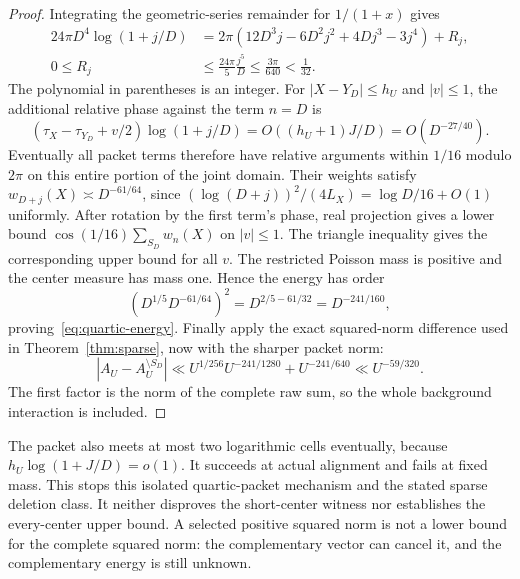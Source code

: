 \begin{proof}
Integrating the geometric-series remainder for $1/(1+x)$ gives
\begin{equation}\label{eq:quartic-taylor}
 \begin{split}
 24\pi D^4\log(1+j/D)
 &=2\pi(12D^3j-6D^2j^2+4Dj^3-3j^4)+R_j,\\
 0\le R_j&\le\frac{24\pi}{5}\frac{j^5}{D}
                  \le\frac{3\pi}{640}<\frac1{32}.
 \end{split}
\end{equation}
The polynomial in parentheses is an integer.
For $|X-Y_D|\le h_U$ and $|v|\le1$, the additional relative phase
against the term $n=D$ is
\[
 (\tau_X-\tau_{Y_D}+v/2)\log(1+j/D)
 =O((h_U+1)J/D)=O(D^{-27/40}).
\]
Eventually all packet terms therefore have relative arguments within
$1/16$ modulo $2\pi$ on this entire portion of the joint domain.
Their weights satisfy $w_{D+j}(X)\asymp D^{-61/64}$, since
$(\log(D+j))^2/(4L_X)=\log D/16+O(1)$ uniformly.
After rotation by the first term's phase, real projection gives a
lower bound $\cos(1/16)\sum_{S_D}w_n(X)$ on $|v|\le1$.
The triangle inequality gives the corresponding upper bound for all
$v$. The restricted Poisson mass is positive and the center measure
has mass one. Hence the energy has order
\[
 (D^{1/5}D^{-61/64})^2=D^{2/5-61/32}=D^{-241/160},
\]
proving~\eqref{eq:quartic-energy}.
Finally apply the exact squared-norm difference used in
Theorem~\ref{thm:sparse}, now with the sharper packet norm:
\[
 |A_U-A_U^{\setminus S_D}|
 \ll U^{1/256}U^{-241/1280}+U^{-241/640}
 \ll U^{-59/320}.
\]
The first factor is the norm of the complete raw sum, so the whole
background interaction is included.
\end{proof}

The packet also meets at most two logarithmic cells eventually,
because $h_U\log(1+J/D)=o(1)$.
It succeeds at actual alignment and fails at fixed mass. This stops
this isolated quartic-packet mechanism and the stated sparse deletion
class. It neither disproves the short-center witness nor establishes
the every-center upper bound. A selected positive squared norm is not
a lower bound for the complete squared norm: the complementary vector
can cancel it, and the complementary energy is still unknown.
